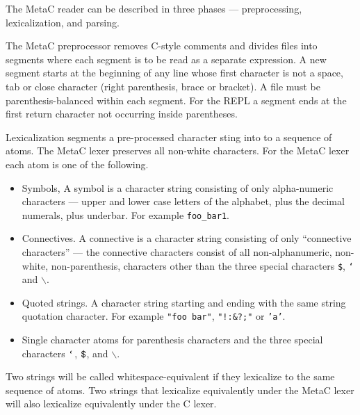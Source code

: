 \documentclass{article}
\newcommand{\mtt}[1]{\mbox{\tt #1}}
\begin{document}
The MetaC reader can be described in three phases --- preprocessing, lexicalization, and parsing.

The MetaC preprocessor removes C-style comments and divides files into segments where each segment is to be read as a separate expression.
A new segment starts at the beginning of any line whose first character is not a space, tab or close character (right parenthesis, brace or bracket).
A file must be parenthesis-balanced within each segment.
For the REPL a segment ends at the first return character not occurring inside parentheses.

Lexicalization segments a pre-processed character sting into to a sequence of atoms.
The MetaC lexer preserves all non-white characters.  For the MetaC lexer each atom is one of the following.

\begin{itemize}
\item Symbols,  A symbol is a character string consisting of only alpha-numeric characters --- upper and lower case letters of the alphabet, plus the decimal numerals, plus underbar.
  For example {\tt foo\_bar1}.
\item Connectives.  A connective is a character string consisting of only ``connective characters'' --- the connective characters consist of all non-alphanumeric, non-white, non-parenthesis, characters
  other than the three special characters {\tt \$}, {\tt `} and $\backslash$.
\item Quoted strings.  A character string starting and ending with the same string quotation character.  For example {\tt "foo bar"}, {\tt "!:\&?;"} or {\tt 'a'}.
\item Single character atoms for parenthesis characters and the three special characters $\mtt{`}$, $\mtt{\$}$, and $\backslash$.
\end{itemize}

Two strings will be called whitespace-equivalent if they lexicalize to the same sequence of atoms.
Two strings that lexicalize equivalently under the MetaC lexer will also lexicalize equivalently under the C lexer.

\newcommand{\sym}{\mathrm{SYM}}
\newcommand{\conn}{\mathrm{CONN}}
\newcommand{\quot}{\mathrm{QUOTE}}
\newcommand{\misc}{\mathrm{MISC}}
\newcommand{\app}{\mathrm{APP}}
\newcommand{\var}{\mathrm{VAR}}
\end{document}
